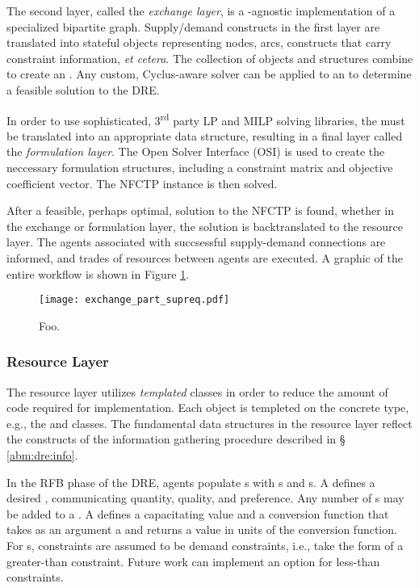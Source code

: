 The second layer, called the \textit{exchange layer}, is a
-agnostic implementation of a specialized bipartite
graph. Supply/demand constructs in the first layer are translated into stateful
objects representing nodes, arcs, constructs that carry constraint information,
\textit{et cetera}. The collection of objects and structures combine to create
an . Any custom, Cyclus-aware solver can be applied to an
 to determine a feasible solution to the DRE.

In order to use sophisticated, 3\textsuperscript{rd} party LP and MILP solving
libraries, the  must be translated into an appropriate data
structure, resulting in a final layer called the \textit{formulation layer}. The
Open Solver Interface (OSI) is used to create the neccessary formulation
structures, including a constraint matrix and objective coefficient vector. The
NFCTP instance is then solved.

After a feasible, perhaps optimal, solution to the NFCTP is found, whether in
the exchange or formulation layer, the solution is backtranslated to the
resource layer. The agents associated with succsessful supply-demand connections
are informed, and trades of resources between agents are executed. A graphic of
the entire workflow is shown in Figure \ref{fig:dre_impl}.

\begin{figure}
  \begin{center}
    \texttt{[image: exchange\_part\_supreq.pdf]}
    \caption[]{
      \label{fig:dre_impl}
      Foo.}
  \end{center}
\end{figure}

\subsubsection{Resource Layer}

The resource layer utilizes \textit{templated} classes in order to reduce the
amount of code required for implementation. Each object is templeted on the
concrete  type, e.g., the  and 
classes. The fundamental data structures in the resource layer reflect the
constructs of the information gathering procedure described in \S
\ref{abm:dre:info}.

In the RFB phase of the DRE, agents populate s with
s and s. A 
defines a desired , communicating quantity, quality, and
preference. Any number of s may be added to a
. A  defines a
capacitating value and a conversion function that takes as an argument a
 and returns a value in units of the conversion function. For
s, constraints are assumed to be demand constraints,
i.e., take the form of a greater-than constraint. Future work can implement an
option for less-than constraints.

